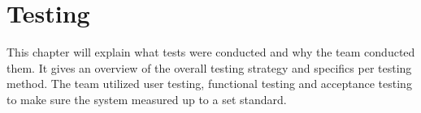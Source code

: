 \chapter{Testing}
This chapter will explain what tests were conducted and why the team conducted them. It gives an overview of the overall testing strategy and specifics per testing method. The team utilized user testing, functional testing and acceptance testing to make sure the system measured up to a set standard.





